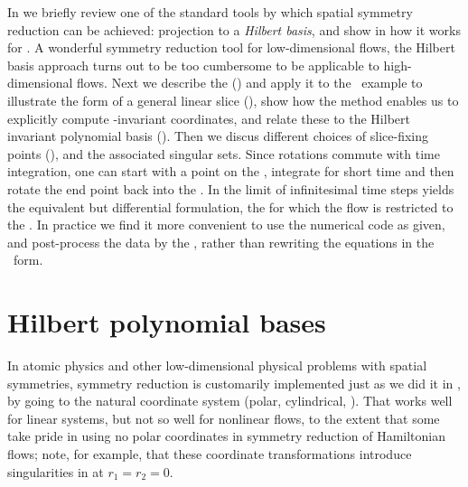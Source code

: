 \documentclass[preprint,number,sort&compress]{elsarticle}
\begin{document}
In  we briefly review one of the standard
tools by which spatial symmetry reduction can be achieved:
projection to a \emph{Hilbert basis}, and show in
 how it works for \cLf. A wonderful
symmetry reduction tool for low-dimensional flows, the
Hilbert basis approach turns out to be too cumbersome to be
applicable to high-dimensional flows. Next we describe the
\emph{\mframes} () and apply it to the \cLf\
example to illustrate the form of a general linear slice
(), show how the method enables us
to explicitly compute \Group-in\-vari\-ant coordinates, and
relate these to the Hilbert in\-vari\-ant polynomial basis
(). Then we discus different choices
of slice-fixing points (), and the
associated singular sets.
Since rotations commute with time integration, one can
start with a point on the \slice,
integrate for short time and then rotate the
end point back into the \slice.
In  the limit of
infinitesimal time steps yields the equivalent but differential
formulation, the \emph{\mslices} for which the flow is restricted to
the \reducedsp.
In practice we find it more convenient to use the
numerical code as given, and post-process the data by the \mframes,
rather than rewriting the equations in the \mslices\ form.


\section{\label{s:Hilbert} Hilbert polynomial bases}

In atomic physics and other low-dimensional physical problems
with spatial symmetries, symmetry reduction is customarily
implemented just as we did it in , by
going to the natural coordinate system (polar, cylindrical,
\etc). That works well for linear systems, but not so well
for nonlinear flows, to the extent that some take pride in
using no polar coordinates in symmetry reduction of
Hamiltonian flows; note, for
example, that these coordinate transformations introduce
singularities in  at $r_1=r_2=0$.
\end{document}
